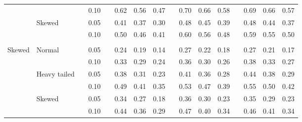 \documentclass[12pt]{article} %
\begin{document}
\begin{table}[ht]
\begin{scriptsize}
\begin{center}
\begin{tabular}{ll p{.1cm} c p{.1cm} rrr p{.1cm} rrr p{.1cm} rrr}
             &              && 0.10 &&   0.62 & 0.56 & 0.47 && 0.70 & 0.66 & 0.58 && 0.69 & 0.66 & 0.57 \\
             & Skewed       && 0.05 &&   0.41 & 0.37 & 0.30 && 0.48 & 0.45 & 0.39 && 0.48 & 0.44 & 0.37 \\
             &              && 0.10 &&   0.50 & 0.46 & 0.41 && 0.60 & 0.56 & 0.48 && 0.59 & 0.55 & 0.50 \\
             &&&&&&&&&&&&&&&\\
Skewed       & Normal       && 0.05 &&   0.24 & 0.19 & 0.14 && 0.27 & 0.22 & 0.18 &&  0.27 & 0.21 & 0.17 \\ 
             &              && 0.10 &&   0.33 & 0.29 & 0.24 && 0.36 & 0.30 & 0.26 &&  0.38 & 0.33 & 0.27 \\ 
             & Heavy tailed && 0.05 &&   0.38 & 0.31 & 0.23 && 0.41 & 0.36 & 0.28 &&  0.44 & 0.38 & 0.29 \\ 
             &              && 0.10 &&   0.49 & 0.41 & 0.35 && 0.53 & 0.47 & 0.39 &&  0.55 & 0.50 & 0.42 \\ 
             & Skewed       && 0.05 &&   0.34 & 0.27 & 0.18 && 0.36 & 0.30 & 0.23 &&  0.35 & 0.29 & 0.23 \\ 
             &              && 0.10 &&   0.44 & 0.36 & 0.29 && 0.47 & 0.40 & 0.34 &&  0.46 & 0.41 & 0.34 \\ 



\end{tabular}
\end{center}
\end{scriptsize}
\end{table}
\end{document}
